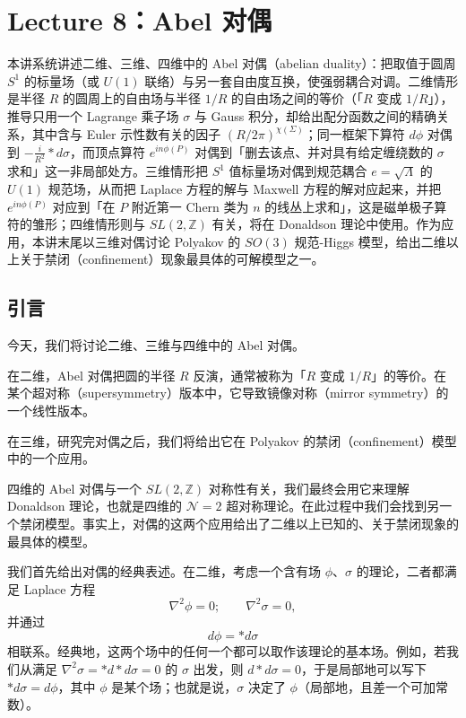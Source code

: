 \section{Lecture 8：Abel 对偶}

\begin{keytakeaways}
本讲系统讲述二维、三维、四维中的 Abel 对偶（abelian duality）：把取值于圆周 $S^1$ 的标量场（或 $U(1)$ 联络）与另一套自由度互换，使强弱耦合对调。二维情形是半径 $R$ 的圆周上的自由场与半径 $1/R$ 的自由场之间的等价（「$R$ 变成 $1/R$」），推导只用一个 Lagrange 乘子场 $\sigma$ 与 Gauss 积分，却给出配分函数之间的精确关系，其中含与 Euler 示性数有关的因子 $(R/2\pi)^{\chi(\Sigma)}$；同一框架下算符 $d\phi$ 对偶到 $-\frac{i}{R^2}\ast d\sigma$，而顶点算符 $e^{in\phi(P)}$ 对偶到「删去该点、并对具有给定缠绕数的 $\sigma$ 求和」这一非局部处方。三维情形把 $S^1$ 值标量场对偶到规范耦合 $e=\sqrt{\Lambda}$ 的 $U(1)$ 规范场，从而把 Laplace 方程的解与 Maxwell 方程的解对应起来，并把 $e^{in\phi(P)}$ 对应到「在 $P$ 附近第一 Chern 类为 $n$ 的线丛上求和」，这是磁单极子算符的雏形；四维情形则与 $SL(2,\mathbb{Z})$ 有关，将在 Donaldson 理论中使用。作为应用，本讲末尾以三维对偶讨论 Polyakov 的 $SO(3)$ 规范-Higgs 模型，给出二维以上关于禁闭（confinement）现象最具体的可解模型之一。
\end{keytakeaways}

\subsection{引言}

今天，我们将讨论二维、三维与四维中的 Abel 对偶。

在二维，Abel 对偶把圆的半径 $R$ 反演，通常被称为「$R$ 变成 $1/R$」的等价。在某个超对称（supersymmetry）版本中，它导致镜像对称（mirror symmetry）的一个线性版本。

在三维，研究完对偶之后，我们将给出它在 Polyakov 的禁闭（confinement）模型中的一个应用。

四维的 Abel 对偶与一个 $SL(2,\mathbb{Z})$ 对称性有关，我们最终会用它来理解 Donaldson 理论，也就是四维的 $\mathcal{N}=2$ 超对称理论。在此过程中我们会找到另一个禁闭模型。事实上，对偶的这两个应用给出了二维以上已知的、关于禁闭现象的最具体的模型。

我们首先给出对偶的经典表述。在二维，考虑一个含有场 $\phi$、$\sigma$ 的理论，二者都满足 Laplace 方程
\begin{equation}
  \tag{8.1}
  \label{eq:8-1}
  \nabla^2\phi=0;\qquad \nabla^2\sigma=0,
\end{equation}
并通过
\begin{equation}
  \tag{8.2}
  \label{eq:8-2}
  d\phi=\ast d\sigma
\end{equation}
相联系。经典地，这两个场中的任何一个都可以取作该理论的基本场。例如，若我们从满足 $\nabla^2\sigma=\ast d\ast d\sigma=0$ 的 $\sigma$ 出发，则 $d\ast d\sigma=0$，于是局部地可以写下 $\ast d\sigma=d\phi$，其中 $\phi$ 是某个场；也就是说，$\sigma$ 决定了 $\phi$（局部地，且差一个可加常数）。

